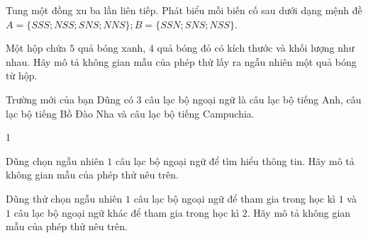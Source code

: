 \begin{bt}%
	Tung một đồng xu ba lần liên tiếp. Phát biểu mỗi biến cố sau dưới dạng mệnh đề $A=\big\{SSS;NSS;SNS;NNS\big\}; B=\big\{SSN;SNS;NSS\big\}$.
\end{bt}

\begin{bt}%
	Một hộp chứa $5$ quả bóng xanh, $4$ quả bóng đỏ có kích thước và khối lượng như nhau. Hãy mô tả không gian mẫu của phép thử lấy ra ngẫu nhiên một quả bóng từ hộp.
\end{bt}

\begin{bt}%
	Trường mới của bạn Dũng có $3$ câu lạc bộ ngoại ngữ là câu lạc bộ tiếng Anh, câu lạc bộ tiếng Bồ Đào Nha và câu lạc bộ tiếng Campuchia.
	\begin{enumEX}[a)]{1}
		\item Dũng chọn ngẫu nhiên $1$ câu lạc bộ ngoại ngữ để tìm hiểu thông tin. Hãy mô tả không gian mẫu của phép thử nêu trên.
		\item Dũng thử chọn ngẫu nhiên $1$ câu lạc bộ ngoại ngữ để tham gia trong học kì $1$ và $1$ câu lạc bộ ngoại ngữ khác để tham gia trong học kì $2$. Hãy mô tả không gian mẫu của phép thử nêu trên.
	\end{enumEX}
\end{bt}


